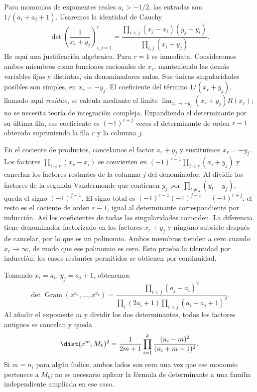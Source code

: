 \begin{solucion}
Para monomios de exponentes reales $a_i>-1/2$, las entradas son $1/(a_i+a_j+1)$. Usaremos la identidad de Cauchy
\begin{equation}\label{ch31:cauchydet}
 \det\left(\frac1{x_i+y_j}\right)_{i,j=1}^{r}
 =\frac{\prod_{i<j}(x_j-x_i)(y_j-y_i)}{\prod_{i,j}(x_i+y_j)}.
\end{equation}
He aquí una justificación algebraica. Para $r=1$ es inmediata. Consideremos ambos miembros como funciones racionales de $x_r$, manteniendo las demás variables fijas y distintas, sin denominadores nulos. Sus únicas singularidades posibles son simples, en $x_r=-y_j$. El coeficiente del término $1/(x_r+y_j)$, llamado aquí \emph{residuo}, se calcula mediante el límite $\lim_{x_r\to-y_j}(x_r+y_j)R(x_r)$; no se necesita teoría de integración compleja. Expandiendo el determinante por su última fila, ese coeficiente es $(-1)^{r+j}$ veces el determinante de orden $r-1$ obtenido suprimiendo la fila $r$ y la columna $j$.

En el cociente de productos, cancelamos el factor $x_r+y_j$ y sustituimos $x_r=-y_j$. Los factores $\prod_{i<r}(x_r-x_i)$ se convierten en $(-1)^{r-1}\prod_{i<r}(x_i+y_j)$ y cancelan los factores restantes de la columna $j$ del denominador. Al dividir los factores de la segunda Vandermonde que contienen $y_j$ por $\prod_{l\ne j}(y_l-y_j)$, queda el signo $(-1)^{j-1}$. El signo total es $(-1)^{r-1}(-1)^{j-1}=(-1)^{r+j}$; el resto es el cociente de orden $r-1$, igual al determinante correspondiente por inducción. Así los coeficientes de todas las singularidades coinciden. La diferencia tiene denominador factorizado en los factores $x_r+y_j$ y ninguno subsiste después de cancelar, por lo que es un polinomio. Ambos miembros tienden a cero cuando $x_r\to\infty$, de modo que ese polinomio es cero. Esto prueba la identidad por inducción; los casos restantes permitidos se obtienen por continuidad.

Tomando $x_i=a_i$, $y_j=a_j+1$, obtenemos
\[
 \det\operatorname{Gram}(x^{a_1},\dots,x^{a_r})
 =\frac{\prod_{i<j}(a_j-a_i)^2}
 {\prod_i(2a_i+1)\prod_{i<j}(a_i+a_j+1)^2}.
\]
Al añadir el exponente $m$ y dividir los dos determinantes, todos los factores antiguos se cancelan y queda
\begin{equation}\label{ch31:muntzdist}
 \dist(x^m,M_k)^2
 =\frac1{2m+1}\prod_{i=1}^{k}\frac{(n_i-m)^2}{(n_i+m+1)^2}.
\end{equation}
Si $m=n_i$ para algún índice, ambos lados son cero una vez que ese monomio pertenece a $M_k$; no es necesario aplicar la fórmula de determinante a una familia independiente ampliada en ese caso.


\end{solucion}
